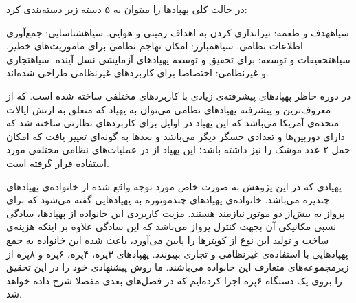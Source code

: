 \noindent در حالت کلی پهپادها را میتوان به ۵ دسته زیر دسته‌بندی کرد:
\begin{enumerate}\setlength\itemsep{0em}
 ‌سیاه{هدف و طعمه:} تیراندازی کردن به اهداف زمینی و هوایی.
 ‌سیاه{شناسایی:} جمع‌آوری اطلاعات نظامی.
 ‌سیاه{مبارز:} امکان تهاجم نظامی برای ماموریت‌های خطیر.
 ‌سیاه{تحقیقات و توسعه:} برای تحقیق و توسعه پهپادهای آزمایشی نسل آینده.
 ‌سیاه{تجاری و غیرنظامی:} اختصاصا برای کاربردهای غیرنظامی طراحی شده‌اند.
\end{enumerate}

در دوره حاظر پهپادهای پیشرفته‌ی زیادی با کاربردهای مختلفی ساخته شده است. که از معروف‌ترین و پیشرفته پهپادهای نظامی می‌توان به پهپاد  که متعلق به ارتش ایالات متحده‌ی آمریکا می‌باشد که این پهپاد در اوایل  برای کاربردهای نظارتی ساخته شد که دارای دوربین‌ها و تعدادی حسگر دیگر می‌باشد و بعدها به گونه‌ای تغییر یافت که امکان حمل ۲ عدد موشک را نیز داشته باشد؛ این پهپاد از  در عملیات‌های نظامی مختلفی مورد استفاده قرار گرفته است.


پهپادی که در این پژوهش به صورت خاص مورد توجه واقع شده از خانواده‌ی پهپاد‌های چندپره می‌باشد. خانواده‌ی پهپادهای چندموتوره به پهپادهایی گفته می‌شود که برای پرواز به بیش‌از دو موتور نیازمند هستند. مزیت کاربردی این خانواده از پهپادها، سادگی نسبی مکانیکی آن بجهت کنترل پرواز می‌باشد که این سادگی علاوه بر اینکه هزینه‌ی ساخت و تولید این نوع از کوپترها را پایین می‌آورد، باعث شده این خانواده به جمع پهپادهایی با استفاده‌ی غیرنظامی و تجاری بپیوندد. پهپادهای ۳پره، ۴پره، ۶پره و ۸پره از زیرمجموعه‌های متعارف این خانواده می‌باشند. ما روش پیشنهادی خود را در این تحقیق را بروی یک دستگاه ۶پره اجرا کرده‌ایم که در فصل‌های بعدی مفصلا شرح داده خواهد شد.

